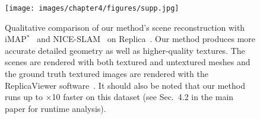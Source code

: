 \begin{figure}[t]
    \begin{center}
        \texttt{[image: images/chapter4/figures/supp.jpg]}
    \end{center}
    \caption{Qualitative comparison of our method's scene reconstruction with iMAP$^*$~\cite{sucar2021imap} and NICE-SLAM~\cite{zhu2022nice} on Replica~\cite{replica19arxiv}. Our method produces more accurate detailed geometry as well as higher-quality textures. The scenes are rendered with both textured and untextured meshes and the ground truth textured images are rendered with the ReplicaViewer software~\cite{replica19arxiv}. It should also be noted that our method runs up to $\times$10 faster on this dataset (see Sec.~4.2 in the main paper for runtime analysis).}
    \label{fig:c4_supp}
\end{figure}

